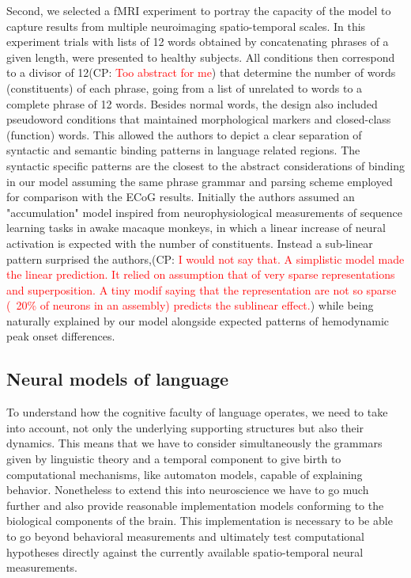 \documentclass[10pt]{article}
\newcommand{\noteCP}[1]{(CP: \textcolor{red}{#1})}
\begin{document}
Second, we selected a fMRI experiment \cite{Pallier_2011} to portray the capacity of the model to capture results from multiple neuroimaging spatio-temporal scales.
In this experiment trials with lists of 12 words obtained by concatenating phrases of a given length, were presented to healthy subjects.
All conditions then correspond to a divisor of 12\noteCP{Too abstract for me} that determine the number of words (constituents) of each phrase, going from a list of unrelated to words to a complete phrase of 12 words.
Besides normal words, the design also included pseudoword conditions that maintained morphological markers and closed-class (function) words.
This allowed the authors to depict a clear separation of syntactic and semantic binding patterns in language related regions.
The syntactic specific patterns are the closest to the abstract considerations of binding in our model assuming the same phrase grammar and parsing scheme employed for comparison with the ECoG results.
Initially the authors assumed an "accumulation" model inspired from neurophysiological measurements of sequence learning tasks in awake macaque monkeys, in which a linear increase of neural activation is expected with the number of constituents.
Instead a sub-linear pattern surprised the authors,\noteCP{I would not say that. A simplistic model made the linear prediction. It relied on assumption that of very sparse representations and superposition. A tiny modif saying that the representation are not so sparse (~20\% of neurons in an assembly)  predicts the sublinear effect.}  while being naturally explained by our model alongside expected patterns of hemodynamic peak onset differences.


\subsection{Neural models of language}

{\label{619233}}

To understand how the cognitive faculty of language operates, we need to take into account, not only the underlying supporting structures but also their dynamics. 
This means that we have to consider simultaneously the grammars given by linguistic theory and a temporal component to give birth to computational mechanisms, like automaton models, capable of explaining behavior\cite{hale2014automaton}.
Nonetheless to extend this into neuroscience we have to go much further and also provide reasonable implementation models conforming to the biological components of the brain.
This implementation is necessary to be able to go beyond behavioral measurements and ultimately test computational hypotheses directly against the currently available spatio-temporal neural measurements.
\end{document}
